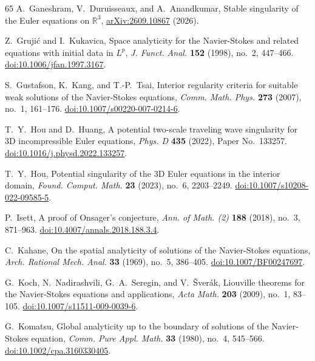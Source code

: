 \documentclass[11pt,reqno]{amsproc}
\numberwithin{equation}{section}
\theoremstyle{remark}
\newcommand{\RR}{\mathbb R}
\begin{document}
\begin{thebibliography}{65}
A.~Ganeshram, V.~Duruisseaux, and A.~Anandkumar,
Stable singularity of the Euler equations on $\RR^3$,
\href{https://arxiv.org/abs/2609.10867}{arXiv:2609.10867} (2026).

Z.~Gruji\'c and I.~Kukavica,
Space analyticity for the Navier-Stokes and related equations with initial data in $L^p$,
\emph{J. Funct. Anal.} \textbf{152} (1998), no.~2, 447--466.
\href{https://doi.org/10.1006/jfan.1997.3167}{doi:10.1006/jfan.1997.3167}.

S.~Gustafson, K.~Kang, and T.-P.~Tsai,
Interior regularity criteria for suitable weak solutions of the Navier-Stokes equations,
\emph{Comm. Math. Phys.} \textbf{273} (2007), no.~1, 161--176.
\href{https://doi.org/10.1007/s00220-007-0214-6}{doi:10.1007/s00220-007-0214-6}.

T.~Y.~Hou and D.~Huang,
A potential two-scale traveling wave singularity for 3D incompressible Euler equations,
\emph{Phys. D} \textbf{435} (2022), Paper No.~133257.
\href{https://doi.org/10.1016/j.physd.2022.133257}{doi:10.1016/j.physd.2022.133257}.

T.~Y.~Hou,
Potential singularity of the 3D Euler equations in the interior domain,
\emph{Found. Comput. Math.} \textbf{23} (2023), no.~6, 2203--2249.
\href{https://doi.org/10.1007/s10208-022-09585-5}{doi:10.1007/s10208-022-09585-5}.

P.~Isett,
A proof of Onsager's conjecture,
\emph{Ann. of Math. (2)} \textbf{188} (2018), no.~3, 871--963.
\href{https://doi.org/10.4007/annals.2018.188.3.4}{doi:10.4007/\allowbreak annals.2018.188.3.4}.

C.~Kahane,
On the spatial analyticity of solutions of the Navier-Stokes equations,
\emph{Arch. Rational Mech. Anal.} \textbf{33} (1969), no.~5, 386--405.
\href{https://doi.org/10.1007/BF00247697}{doi:10.1007/BF00247697}.

G.~Koch, N.~Nadirashvili, G.~A.~Seregin, and V.~\v{S}ver\'ak,
Liouville theorems for the Navier-Stokes equations and applications,
\emph{Acta Math.} \textbf{203} (2009), no.~1, 83--105.
\href{https://doi.org/10.1007/s11511-009-0039-6}{doi:10.1007/s11511-009-0039-6}.

G.~Komatsu,
Global analyticity up to the boundary of solutions of the Navier-Stokes equation,
\emph{Comm. Pure Appl. Math.} \textbf{33} (1980), no.~4, 545--566.
\href{https://doi.org/10.1002/cpa.3160330405}{doi:10.1002/cpa.3160330405}.


\end{thebibliography}
\end{document}

